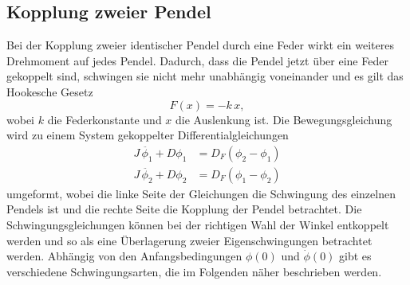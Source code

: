 \subsection{Kopplung zweier Pendel} %
\label{subsec:Schwingungen}
 Bei der Kopplung zweier identischer Pendel durch eine Feder wirkt ein weiteres Drehmoment auf jedes Pendel.
 Dadurch, dass die Pendel jetzt über eine Feder gekoppelt sind, schwingen sie nicht mehr unabhängig voneinander und es gilt das Hookesche Gesetz
 \begin{equation*}
     F(x) = -k \, x ,
 \end{equation*}
 wobei $k$ die Federkonstante und $x$ die Auslenkung ist.
 Die Bewegungsgleichung wird zu einem System gekoppelter Differentialgleichungen
 \begin{align*}
     J \, \ddot{\phi_1} + D \phi_1 &= D_F (\phi_2 - \phi_1) \\
     J \, \ddot{\phi_2} + D \phi_2 &= D_F (\phi_1 - \phi_2)
 \end{align*}
 umgeformt, wobei die linke Seite der Gleichungen die Schwingung des einzelnen Pendels ist und die rechte Seite die Kopplung der Pendel betrachtet.
 Die Schwingungsgleichungen können bei der richtigen Wahl der Winkel entkoppelt werden und so als eine Überlagerung zweier Eigenschwingungen betrachtet werden.
 Abhängig von den Anfangsbedingungen $\phi(0)$ und $\dot{\phi}(0)$ gibt es verschiedene Schwingungsarten, die im Folgenden näher beschrieben werden.


